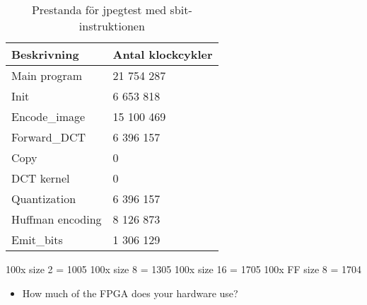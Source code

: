 \documentclass[a4paper]{article}
\begin{document}
\begin{table}[ht]
    \centering
    \begin{tabular}{l l}
        Beskrivning & Antal klockcykler\\
        \hline
        Main program  & 21 754 287 \\
        Init  & 6 653 818 \\
        Encode\_image  & 15 100 469 \\
        Forward\_DCT  & 6 396 157 \\
        Copy  & 0 \\
        DCT kernel  & 0 \\
        Quantization  & 6 396 157 \\
        Huffman encoding  & 8 126 873 \\
        Emit\_bits  & 1 306 129 \\
    \end{tabular}
    \caption{ Prestanda för jpegtest med sbit-instruktionen }
    \label{tab:jpeg_sbit_performance}
\end{table}



100x size 2 = 1005
100x size 8 = 1305
100x size 16 = 1705
100x FF size 8 = 1704




\begin{itemize}
\item How much of the FPGA does your hardware use?
\end{itemize}
\end{document}
